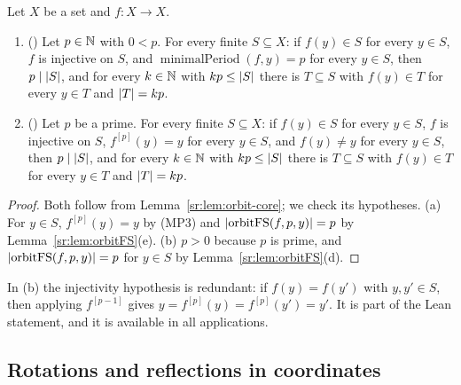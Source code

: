 \begin{lemma}\label{sr:lem:orbit}
Let $X$ be a set and $f\colon X\to X$.
\begin{enumerate}[label=(\alph*)]
\item () Let $p\in\mathbb N$ with $0<p$. For every finite $S\subseteq X$: if $f(y)\in S$ for
  every $y\in S$, $f$ is injective on $S$, and $\operatorname{minimalPeriod}(f,y)=p$ for every $y\in S$, then
  $p\mid\lvert S\rvert$, and for every $k\in\mathbb N$ with $kp\le\lvert S\rvert$ there is $T\subseteq S$ with $f(y)\in T$ for every $y\in
  T$ and $\lvert T\rvert=kp$.
\item () Let $p$ be a prime. For every finite $S\subseteq X$: if $f(y)\in S$ for every $y\in S$,
  $f$ is injective on $S$, $f^{[p]}(y)=y$ for every $y\in S$, and $f(y)\ne y$ for every $y\in S$, then $p\mid\lvert S\rvert$,
  and for every $k\in\mathbb N$ with $kp\le\lvert S\rvert$ there is $T\subseteq S$ with $f(y)\in T$ for every $y\in T$ and $\lvert T\rvert=kp$.
\end{enumerate}
\end{lemma}

\begin{proof}
Both follow from Lemma~\ref{sr:lem:orbit-core}; we check its hypotheses. (a) For $y\in S$, $f^{[p]}(y)=y$ by (MP3) and
$\lvert\operatorname{orbitFS}(f,p,y)\rvert=p$ by Lemma~\ref{sr:lem:orbitFS}(e). (b) $p>0$ because $p$ is prime, and
$\lvert\operatorname{orbitFS}(f,p,y)\rvert=p$ for $y\in S$ by Lemma~\ref{sr:lem:orbitFS}(d).
\end{proof}

In (b) the injectivity hypothesis is redundant: if $f(y)=f(y')$ with $y,y'\in S$, then applying $f^{[p-1]}$ gives
$y=f^{[p]}(y)=f^{[p]}(y')=y'$. It is part of the Lean statement, and it is available in all applications.

\subsection{Rotations and reflections in coordinates}\label{sr:ssec:maps}

